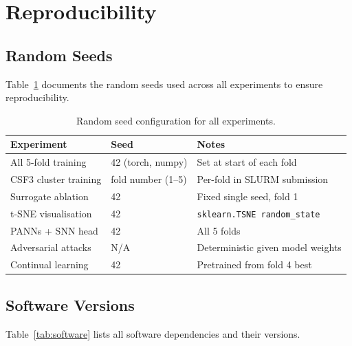 \section{Reproducibility}
\label{sec:app-reproducibility}

\subsection{Random Seeds}

Table~\ref{tab:seeds} documents the random seeds used across all experiments to ensure reproducibility.

\begin{table}[H]
\centering
\caption{Random seed configuration for all experiments.}
\label{tab:seeds}
\small
\begin{tabular}{lll}
\toprule
\textbf{Experiment} & \textbf{Seed} & \textbf{Notes} \\
\midrule
All 5-fold training        & 42 (torch, numpy)  & Set at start of each fold \\
CSF3 cluster training      & fold number (1--5) & Per-fold in SLURM submission \\
Surrogate ablation         & 42                 & Fixed single seed, fold 1 \\
t-SNE visualisation        & 42                 & \texttt{sklearn.TSNE random\_state} \\
PANNs + SNN head           & 42                 & All 5 folds \\
Adversarial attacks        & N/A                & Deterministic given model weights \\
Continual learning         & 42                 & Pretrained from fold 4 best \\
\bottomrule
\end{tabular}
\end{table}

\subsection{Software Versions}

Table~\ref{tab:software} lists all software dependencies and their versions.

